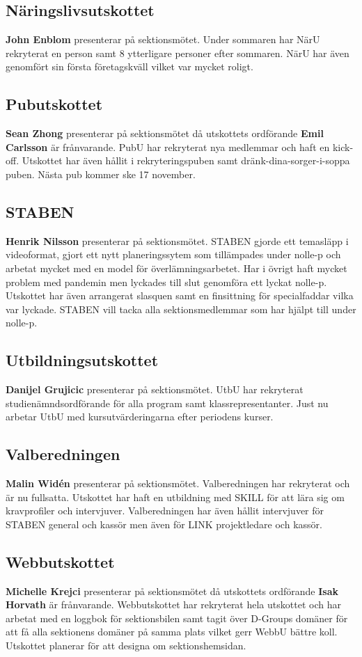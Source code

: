 \documentclass[../protokoll_hostmote_2021.tex]{subfiles}
\begin{document}
\subsection{Näringslivsutskottet}
\textbf{John Enblom} presenterar på sektionsmötet.
Under sommaren har NärU rekryterat en person samt 8 ytterligare personer efter sommaren. NärU har även genomfört sin första företagskväll vilket var mycket roligt.
\subsection{Pubutskottet}
\textbf{Sean Zhong} presenterar på sektionsmötet då utskottets ordförande \textbf{Emil Carlsson} är frånvarande.
PubU har rekryterat nya medlemmar och haft en kick-off. Utskottet har även hållit i rekryteringspuben samt dränk-dina-sorger-i-soppa puben. Nästa pub kommer ske 17 november.
\subsection{STABEN}
\textbf{Henrik Nilsson} presenterar på sektionsmötet.
STABEN gjorde ett temasläpp i videoformat, gjort ett nytt planeringssytem som tillämpades under nolle-p och arbetat mycket med en model för överlämningsarbetet. Har i övrigt haft mycket problem med pandemin men lyckades till slut genomföra ett lyckat nolle-p. Utskottet har även arrangerat slasquen samt en finsittning för specialfaddar vilka var lyckade. STABEN vill tacka alla sektionsmedlemmar som har hjälpt till under nolle-p.
\subsection{Utbildningsutskottet}
\textbf{Danijel Grujicic} presenterar på sektionsmötet.
UtbU har rekryterat studienämndsordförande för alla program samt klassrepresentanter. Just nu arbetar UtbU med kursutvärderingarna efter periodens kurser. 
\subsection{Valberedningen}
\textbf{Malin Widén} presenterar på sektionsmötet.
Valberedningen har rekryterat och är nu fullsatta. Utskottet har haft en utbildning med SKILL för att lära sig om kravprofiler och intervjuver. Valberedningen har även hållit intervjuver för STABEN general och kassör men även för LINK projektledare och kassör. 
\subsection{Webbutskottet}
\textbf{Michelle Krejci} presenterar på sektionsmötet då utskottets ordförande \textbf{Isak Horvath} är frånvarande.
Webbutskottet har rekryterat hela utskottet och har arbetat med en loggbok för sektionsbilen samt tagit över D-Groups domäner för att få alla sektionens domäner på samma plats vilket gerr WebbU bättre koll. Utskottet planerar för att designa om sektionshemsidan.
\end{document}
